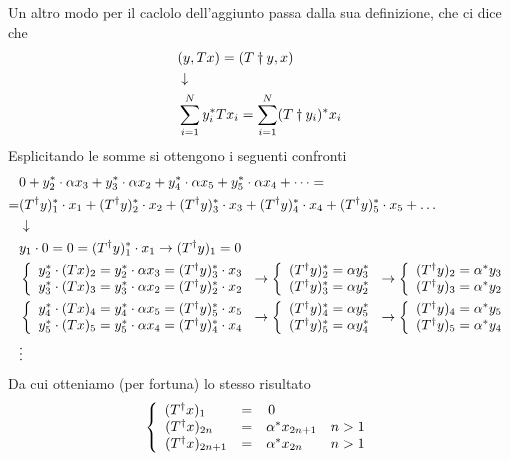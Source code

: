 Un altro modo per il caclolo dell'aggiunto passa dalla sua definizione, che ci dice che
\begin{align}
	&(y,Tx) = (T\dagger y,x) \\ &\downarrow \nonumber \\
	&\sum_{i=1}^{N} y^*_i Tx_i = \sum_{i=1}^{N} (T\dagger y_i)^* x_i
\end{align}
Esplicitando le somme si ottengono i seguenti confronti
\begin{align}
	&0 + y_2^* \cdot \alpha x_3 + y_3^* \cdot \alpha x_2 + y_4^* \cdot \alpha x_5 + y_5^* \cdot \alpha x_4 + \dots =  \nonumber \\
	=&(T^\dagger y)_1^* \cdot x_1 + (T^\dagger y)_2^* \cdot x_2 +(T^\dagger y)_3^* \cdot x_3 +(T^\dagger y)_4^* \cdot x_4 + (T^\dagger y)_5^* \cdot x_5 + \dots\\ &\downarrow \nonumber \\
	&y_1 \cdot 0 = 0  = (T^\dagger y)_1^* \cdot x_1 \to (T^\dagger y)_1 = 0\\
	&\left\{ \begin{array}{cc} y_2^* \cdot (Tx)_2 = y_2^* \cdot \alpha x_3 = (T^\dagger y)_3^* \cdot x_3\\ y_3^* \cdot (Tx)_3 = y_3^* \cdot \alpha x_2 = (T^\dagger y)_2^*\cdot x_2 \end{array} \right. \to  \left\{ \begin{array}{cc} (T^\dagger y)_2^* = \alpha y_3^*\\ (T^\dagger y)_3^* = \alpha y_2^* \end{array} \right. \to  \left\{ \begin{array}{cc} (T^\dagger y)_2
		= \alpha^* y_3\\ (T^\dagger y)_3 = \alpha^* y_2 \end{array} \right.\\
	&\left\{ \begin{array}{cc} y_4^* \cdot (Tx)_4 = y_4^* \cdot \alpha x_5 = (T^\dagger y)_5^*\cdot x_5\\ y_5^* \cdot (Tx)_5 = y_5^* \cdot \alpha x_4 = (T^\dagger y)_4^*\cdot x_4 \end{array} \right. \to \left\{ \begin{array}{cc} (T^\dagger y)_4^* = \alpha y_5^*\\ (T^\dagger y)_5^* = \alpha y_4^* \end{array} \right.\to \left\{ \begin{array}{cc} (T^\dagger y)_4 = \alpha^* y_5\\ (T^\dagger y)_5 = \alpha^* y_4 \end{array} \right.\\
	&\vdots \nonumber
\end{align}
Da cui otteniamo (per fortuna) lo stesso risultato
\begin{align}
	\left\{ \begin{array}{ccc} (T^\dagger x)_1 \quad\;\; &= &0 \;\qquad \qquad \qquad\\ (T^\dagger x)_{2n} \quad &= &\alpha^* x_{2n+1} \quad n> 1\\ (T^\dagger x)_{2n+1} &= &\alpha^* x_{2n} \quad\quad n> 1 \end{array} \right.
\end{align}




